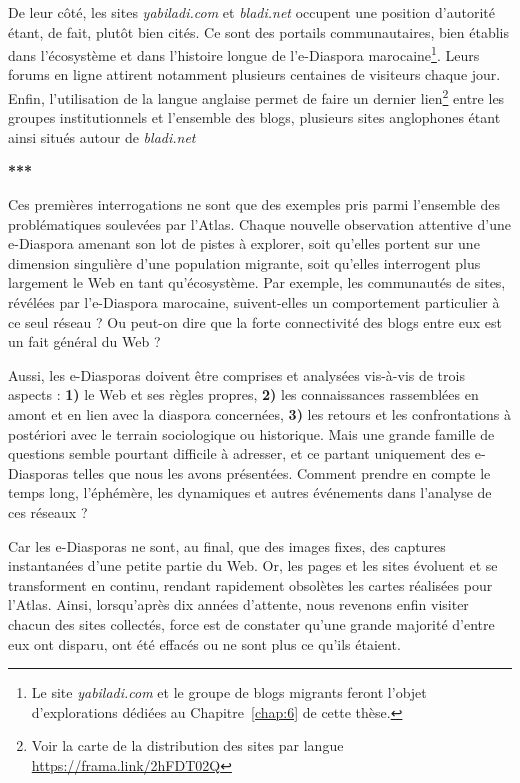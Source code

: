 \documentclass[symmetric,justified,marginals=raggedouter]{tufte-book}
\begin{document}
De leur côté, les sites \textit{yabiladi.com} et \textit{bladi.net} occupent une position d'autorité étant, de fait, plutôt bien cités. Ce sont des portails communautaires, bien établis dans l'écosystème et dans l'histoire longue de l'e-Diaspora marocaine\footnote{\RaggedOuter Le site \textit{yabiladi.com} et le groupe de blogs migrants feront l'objet d'explorations dédiées au Chapitre~\ref{chap:6} de cette thèse.}. Leurs forums en ligne attirent notamment plusieurs centaines de visiteurs chaque jour. Enfin, l'utilisation de la langue anglaise permet de faire un dernier lien\footnote{\RaggedOuter Voir la carte de la distribution des sites par langue \url{https://frama.link/2hFDT02Q}} entre les groupes institutionnels et l'ensemble des blogs, plusieurs sites anglophones étant ainsi situés autour de \textit{bladi.net}

\begin{center}
	\textbf{***}
\end{center}

\noindent Ces premières interrogations ne sont que des exemples pris parmi l'ensemble des problématiques soulevées par l'Atlas. Chaque nouvelle observation attentive d'une e-Diaspora amenant son lot de pistes à explorer, soit qu'elles portent sur une dimension singulière d'une population migrante, soit qu'elles interrogent plus largement le Web en tant qu'écosystème. Par exemple, les communautés de sites, révélées par l'e-Diaspora marocaine, suivent-elles un comportement particulier à ce seul réseau ? Ou peut-on dire que la forte connectivité des blogs entre eux est un fait général du Web ? 

Aussi, les e-Diasporas doivent être comprises et analysées vis-à-vis de trois aspects : \textbf{1)} le Web et ses règles propres, \textbf{2)} les connaissances rassemblées en amont et en lien avec la diaspora concernées, \textbf{3)} les retours et les confrontations à postériori avec le terrain sociologique ou historique. Mais une grande famille de questions semble pourtant difficile à adresser, et ce partant uniquement des e-Diasporas telles que nous les avons présentées. Comment prendre en compte le temps long, l'éphémère, les dynamiques et autres événements dans l'analyse de ces réseaux ? 

Car les e-Diasporas ne sont, au final, que des images fixes, des captures instantanées d'une petite partie du Web. Or, les pages et les sites évoluent et se transforment en continu, rendant rapidement obsolètes les cartes réalisées pour l'Atlas. Ainsi, lorsqu'après dix années d'attente, nous revenons enfin visiter chacun des sites collectés, force est de constater qu'une grande majorité d'entre eux ont disparu, ont été effacés ou ne sont plus ce qu'ils étaient.
\end{document}
